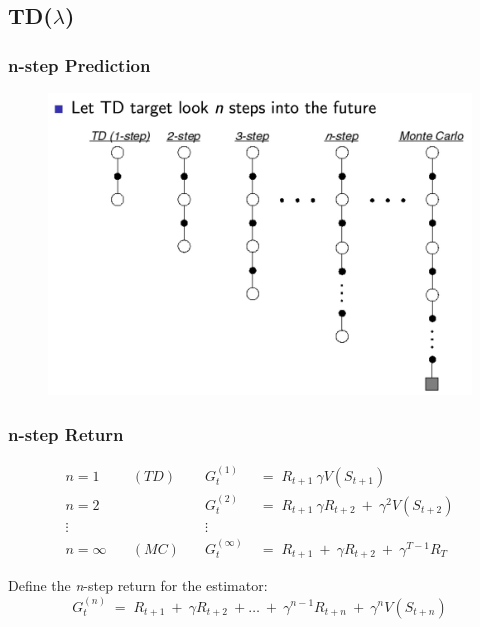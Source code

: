 \documentclass[10pt]{article}
\begin{document}
\subsection{TD($\lambda$)}
\subsubsection*{n-step Prediction}

\begin{figure}[h!]
\includegraphics[scale=0.12]{pictures/n_step_pred.jpg}
\end{figure}
\subsubsection*{n-step Return}
\begin{align*}
n=1 \quad & (TD) \quad &G_{t}^{(1)} \; &= \; R_{t+1} \:  \gamma V(S_{t+1}) \\
n=2 \quad & \quad \quad &G_{t}^{(2)} \; &= \; R_{t+1} \:  \gamma R_{t+2} \: + \: \gamma^{2} V(S_{t+2}) \\
\vdots \quad &\quad \quad &\vdots & \\
n=\infty \quad & (MC) \quad &G_{t}^{(\infty)} \; &= \; R_{t+1} \: + \:  \gamma R_{t+2} \: + \: \gamma^{T-1} R_{T}
\end{align*}

Define the \textit{n}-step return for the estimator:
\begin{equation}
G_{t}^{(n)} \; = \; R_{t+1} \: + \: \gamma R_{t+2} \: + \ldots \: + \: \gamma^{n-1} R_{t+n} \: + \: \gamma^{n} V(S_{t+n}) 
\end{equation}
\end{document}
